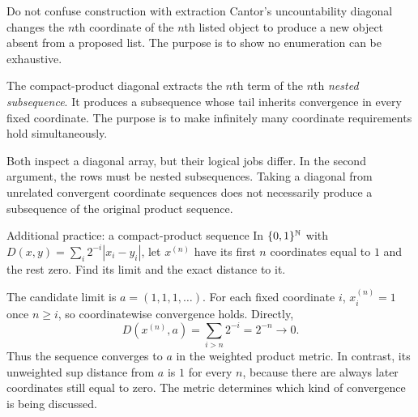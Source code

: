 \begin{note}{Do not confuse construction with extraction}
Cantor's uncountability diagonal changes the $n$th coordinate of the $n$th listed object to produce a new object absent from a proposed list. The purpose is to show no enumeration can be exhaustive.

The compact-product diagonal extracts the $n$th term of the $n$th \emph{nested subsequence}. It produces a subsequence whose tail inherits convergence in every fixed coordinate. The purpose is to make infinitely many coordinate requirements hold simultaneously.

Both inspect a diagonal array, but their logical jobs differ. In the second argument, the rows must be nested subsequences. Taking a diagonal from unrelated convergent coordinate sequences does not necessarily produce a subsequence of the original product sequence.
\end{note}
\begin{exam}{Additional practice: a compact-product sequence}
In $\{0,1\}^{\mathbb N}$ with $D(x,y)=\sum_i2^{-i}|x_i-y_i|$, let $x^{(n)}$ have its first $n$ coordinates equal to $1$ and the rest zero. Find its limit and the exact distance to it.
\end{exam}
\begin{answer}
The candidate limit is $a=(1,1,1,\ldots)$. For each fixed coordinate $i$, $x_i^{(n)}=1$ once $n\ge i$, so coordinatewise convergence holds. Directly,
\[D(x^{(n)},a)=\sum_{i>n}2^{-i}=2^{-n}\to0.\]
Thus the sequence converges to $a$ in the weighted product metric. In contrast, its unweighted sup distance from $a$ is $1$ for every $n$, because there are always later coordinates still equal to zero. The metric determines which kind of convergence is being discussed.
\end{answer}


